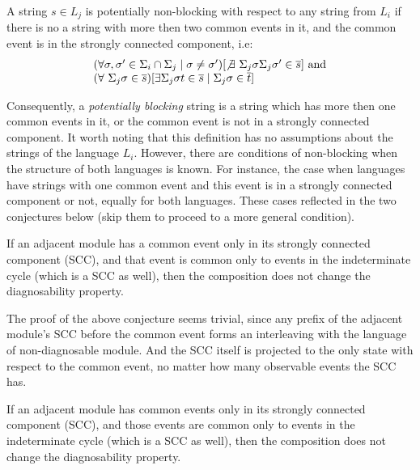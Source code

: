 \documentclass[a4paper,oneside]{article}
\begin{document}
\begin{definition} A string $s \in L_j$ is potentially non-blocking with respect
to any string from $L_i$ if there is no a string with more then two common events
in it, and the common event is in the strongly connected component, i.e:
$$
\begin{array}{l}
	(\forall \sigma, \sigma' \in \Sigma_i \cap \Sigma_j \mid \sigma \neq
	\sigma') 
	[\not \exists ~\Sigma_j \sigma \Sigma_j \sigma' \in \overline{s}]
	\textrm{ and} \\
	(\forall ~\Sigma_j \sigma \in \overline{s}) 
	[\exists \Sigma_j \sigma t \in \overline{s} \mid \Sigma_j \sigma \in \overline{t}]
	
\end{array}
$$
\end{definition}
Consequently, a \emph{potentially blocking} string is a string which has more
then one common events in it, or the common event is not in a strongly connected
component. It worth noting that this definition has no assumptions about the
strings of the language $L_i$. However, there are conditions of non-blocking
when the structure of both languages is known. For instance, the case when 
languages have strings with one common event and this event is in a strongly
connected component or not, equally for both languages. These cases reflected in
the two conjectures below (skip them to proceed to a more general condition).

\begin{conjecture} If an adjacent module has a
common event only in its strongly connected component (SCC), and that event is
common only to events in the indeterminate cycle (which is a SCC as well), then
the composition does not change the diagnosability property.
\end{conjecture} 

The proof of the above conjecture seems trivial, since any prefix of the
adjacent module's SCC before the common event forms an interleaving with the
language of non-diagnosable module. And the SCC itself is projected to the only
state with respect to the common event, no matter how many observable
events the SCC has.

\begin{conjecture} If an adjacent module has 
common events only in its strongly connected component (SCC), and those events
are common only to events in the indeterminate cycle (which is a SCC as well),
then the composition does not change the diagnosability property.
\end{conjecture}
\end{document}
